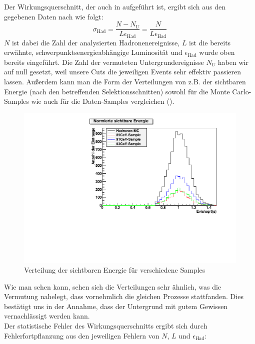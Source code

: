 Der Wirkungsquerschnitt, der auch in  aufgeführt ist, ergibt sich aus den gegebenen Daten nach \cite[Gl.13]{script} wie folgt:
\begin{equation}
\sigma_\mathrm{Had} = \frac{N - N_U}{L\epsilon_\mathrm{Had}} = \frac{N}{L\epsilon_\mathrm{Had}}
\end{equation}
$N$ ist dabei die Zahl der analysierten Hadronenereignisse, $L$ ist die bereits erwähnte, schwerpunktsenergieabhängige Luminosität und $\epsilon_\mathrm{Had}$ wurde oben bereits eingeführt. Die Zahl der vermuteten Untergrundereignisse $N_U$ haben wir auf null gesetzt, weil unsere Cuts die jeweiligen Events sehr effektiv passieren lassen. Außerdem kann man die Form der Verteilungen von z.B. der sichtbaren Energie (nach den betreffenden Selektionsschnitten) sowohl für die Monte Carlo-Samples wie auch für die Daten-Samples vergleichen ().
\begin{figure}[htb]
	\centering
	\includegraphics[width=1\columnwidth,keepaspectratio]{Evis_vgl.pdf}
	\caption{Verteilung der sichtbaren Energie für verschiedene Samples}
	\label{fig:Evis_vgl}
\end{figure}
Wie man sehen kann, sehen sich die Verteilungen sehr ähnlich, was die Vermutung nahelegt, dass vornehmlich die gleichen Prozesse stattfanden. Dies bestätigt uns in der Annahme, dass der Untergrund mit gutem Gewissen vernachlässigt werden kann.\\
Der statistische Fehler des Wirkungsquerschnitts ergibt sich durch Fehlerfortpflanzung aus den jeweiligen Fehlern von $N$, $L$ und $\epsilon_\mathrm{Had}$:
